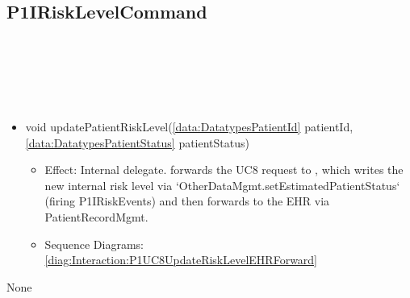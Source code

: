   \subsection{P1IRiskLevelCommand}\label{int:InterfacesP1IRiskLevelCommand}
    \begin{description}
      \item[Provided by:] \iconcomponent{}~
      \item[Required by:] \iconcomponent{}~ 
      \item[Operations:] ~
    \begin{itemize}[noitemsep,nolistsep,leftmargin=-.25cm]
      \item \textsf{void updatePatientRiskLevel(\ref{data:DatatypesPatientId} patientId, \ref{data:DatatypesPatientStatus} patientStatus)}
        \begin{itemize}[noitemsep,nolistsep]
           \item Effect: Internal delegate.  forwards the UC8 request to , which writes the new internal risk level via `OtherDataMgmt.setEstimatedPatientStatus` (firing P1IRiskEvents) and then forwards to the EHR via PatientRecordMgmt. 
           \item Sequence Diagrams: \cref{diag:Interaction:P1UC8UpdateRiskLevelEHRForward}
        \end{itemize}
    \end{itemize}
      \item[Diagrams:] None
    \end{description}

